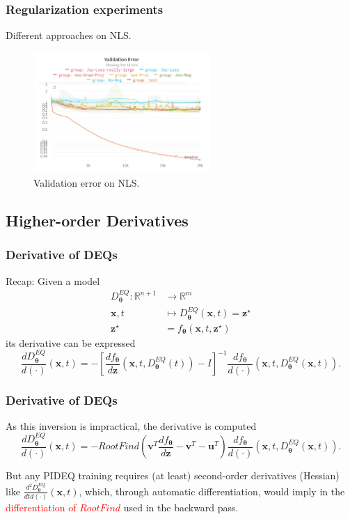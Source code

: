\documentclass[t]{beamer}
\newcommand{\R}{\mathbb{R}}
\begin{document}
\begin{frame}
    \frametitle{Regularization experiments}
    Different approaches on NLS.

    \begin{figure}[h]
        \centering
        \includegraphics[width=0.6\textwidth]{nls_reg.png}
        \caption{Validation error on NLS.}
    \end{figure}
\end{frame}

\subsection{Higher-order Derivatives}

\begin{frame}
    \frametitle{Derivative of DEQs}
    Recap:
    Given a model
    \begin{align*}
	D^{EQ}_{\bm{\theta}}: \R^{n+1} &\longrightarrow \R^{m} \\
	\bm{x},t &\longmapsto 	D^{EQ}_{\bm{\theta}}(\bm{x},t) = \bm{z}^{\star} \\
	\bm{z}^{\star} &= f_{\bm{\theta}}\left( \bm{x},t, \bm{z}^{\star} \right)
    \end{align*}
    its derivative can be expressed \[
    \frac{d D^{EQ}_{\bm{\theta}}}{d (\cdot)}(\bm{x},t) = - \left[ \frac{d f_{\bm{\theta}}}{d \bm{z}}(\bm{x},t,D^{EQ}_{\bm{\theta}}(t)) - I \right]^{-1} \frac{d f_{\bm{\theta}}}{d (\cdot)}(\bm{x},t,D^{EQ}_{\bm{\theta}}(\bm{x},t))
    .\] 
\end{frame}

\begin{frame}
    \frametitle{Derivative of DEQs}
    As this inversion is impractical, the derivative is computed \[
	\frac{d D^{EQ}_{\bm{\theta}}}{d (\cdot)}(\bm{x},t) = - RootFind\left( \bm{v}^T\frac{d f_{\bm{\theta}}}{d \bm{z}} -\bm{v}^T - \bm{u}^T  \right)  \frac{d f_{\bm{\theta}}}{d (\cdot)}(\bm{x},t,D^{EQ}_{\bm{\theta}}(\bm{x},t))
    .\] \pause

    But any PIDEQ training requires (at least) second-order derivatives (Hessian) like $\frac{d^2 D^{EQ}_{\bm{\theta}}}{d t d (\cdot)}(\bm{x},t)$, which, through automatic differentiation, would imply in the \textcolor{red}{differentiation of $RootFind$} used in the backward pass. \pause
\end{frame}
\end{document}
